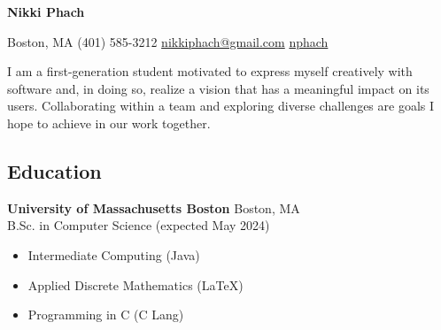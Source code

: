 \documentclass[11pt, letterpaper]{article}
\begin{document}
\begin{center}
    {\huge \textbf{Nikki Phach}}
    
    \vspace{5mm}

    \begin{footnotesize}
    \mbox{} \xdotfill[.5ex]{.4pt} \enspace
    {\color{accent} }
    \enspace Boston, MA \quad\textbar\quad
    {\color{accent} }
    \enspace (401) 585-3212 \quad\textbar\quad
    \href{mailto:nikkiphach@gmail.com}{{\color{accent} } \enspace nikkiphach@gmail.com} \quad\textbar\quad
    \href{https://github.com/nphach}{{\color{accent} } \enspace nphach}
    \enspace \xdotfill[.5ex]{.4pt}
    \end{footnotesize}
    
\end{center}

    \noindent I am a first-generation student motivated to express myself creatively with software and, in doing so, realize a vision that has a meaningful impact on its users. Collaborating within a team and exploring diverse challenges are goals I hope to achieve in our work together.

\subsection*{\color{accent} Education \xdotfill[.5ex]{.4pt}}
\textbf{University of Massachusetts Boston} \hfill Boston, MA \\
B.Sc. in Computer Science \hfill (expected May 2024)

\begin{itemize}[noitemsep]
\item Intermediate Computing (Java)
\item Applied Discrete Mathematics (\LaTeX)
\item Programming in C (C Lang)
\end{itemize}
\end{document}
